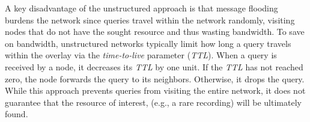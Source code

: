 A key disadvantage of the unstructured approach is that message flooding burdens
the network since queries travel within the network randomly, visiting nodes
that do not have the sought resource and thus wasting bandwidth.  
To save on bandwidth, unstructured networks typically limit how long 
a query travels within the overlay via the \emph{time-to-live} parameter
(\emph{TTL}). 
When a query is received by a node, it decreases its \emph{TTL} by one unit. 
If the \emph{TTL} has not reached zero, the node forwards the query 
to its neighbors.  Otherwise, it drops the query. 
While this approach prevents queries from visiting the entire network, it
does not guarantee that the resource of interest, (e.g., a rare recording) 
will be ultimately found.
\begin{figure}[ht]
\centering
{}\qquad\qquad
{}
\end{figure}
